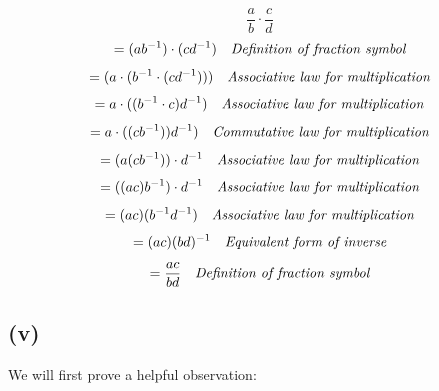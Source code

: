 \documentclass{article}
\begin{document}
\begin{equation*}
	\frac{a}{b} \cdot \frac{c}{d} 
\end{equation*}
\begin{equation*}
	= (ab^{-1}) \cdot (cd^{-1}) \ \ \ \emph{Definition of fraction symbol}
\end{equation*}
\begin{equation*}
	= (a \cdot (b^{-1} \cdot (cd^{-1}))) \ \ \ \mbox{\emph{Associative law for multiplication}}
\end{equation*}
\begin{equation*}
	= a \cdot ((b^{-1} \cdot c) d^{-1}) \ \ \ \mbox{\emph{Associative law for multiplication}}
\end{equation*}
\begin{equation*}
	= a \cdot ((cb^{-1}))d^{-1}) \ \ \ \mbox{\emph{Commutative law for multiplication}}
\end{equation*}
\begin{equation*}
	= (a(cb^{-1})) \cdot d^{-1} \ \ \ \mbox{\emph{Associative law for multiplication}}
\end{equation*}
\begin{equation*}
	= ((ac)b^{-1}) \cdot d^{-1} \ \ \ \mbox{\emph{Associative law for multiplication}}
\end{equation*}
\begin{equation*}
	= (ac)(b^{-1}d^{-1}) \ \ \ \mbox{\emph{Associative law for multiplication}}
\end{equation*}
\begin{equation*}
	= (ac)(bd)^{-1} \ \ \ \mbox{\emph{Equivalent form of inverse}}
\end{equation*}
\begin{equation*}
	= \frac{ac}{bd} \ \ \ \emph{Definition of fraction symbol}
\end{equation*}

\subsection*{(v)}

We will first prove a helpful observation:
\end{document}
